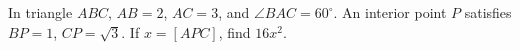 In triangle $ABC$, $AB=2$, $AC=3$, and $\angle BAC=60^\circ$. An interior point $P$ satisfies $BP=1$, $CP=\sqrt3$. If $x=[APC]$, find $16x^2$.
